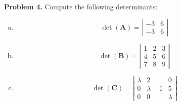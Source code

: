 \documentclass[12pt]{report} %
\theoremstyle{definition}
\begin{document}
\noindent\textbf{Problem 4.} Compute the following determinants:
\begin{enumerate}[(a)]
    \item
    \[
    \det(\mathbf{A})=\left| \begin{array}{cc}
    -3& 6\\
    -3& 6
    \end{array}\right|
    \]
    \item 
    \[
    \det(\mathbf{B})=\left| \begin{array}{ccc}
    1& 2& 3\\
    4& 5& 6\\
    7& 8& 9
    \end{array}\right|
    \]
    \item    
    \[
    \det(\mathbf{C})=\left| \begin{array}{ccc}
    \lambda& 2& 0\\
    0& \lambda -1& 5\\
    0& 0& \lambda
    \end{array}\right|
    \]
\end{enumerate}
\end{document}
